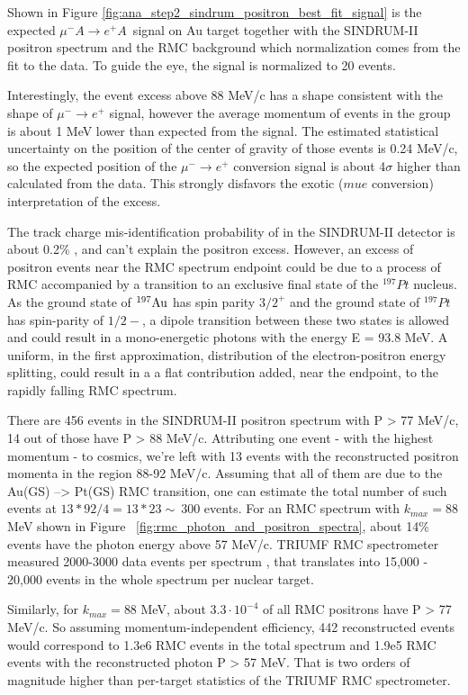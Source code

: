\documentclass[12pt]{article}
\newcommand {\Au}[1]     {\mbox{$\rm ^{#1}Au$}}                 %
\newcommand {\mumepconv} {\mbox{$\mu^- A \rightarrow e^+ A$}}
\begin{document}
Shown in Figure \ref{fig:ana_step2_sindrum_positron_best_fit_signal} is the expected
\mumepconv\ signal on Au target together with the SINDRUM-II positron spectrum and the
RMC background which normalization comes from the fit to the data. To guide the eye,
the signal is normalized to 20 events.

Interestingly, the event excess above 88 MeV/c has a shape consistent with the shape
of $\mu^- \rightarrow e^+$ signal, however the average momentum of events in the group
is about 1 MeV lower than expected from the signal.
The estimated statistical uncertainty on the position of the center of gravity of those
events is 0.24 MeV/c, so the expected position of the $\mu^- \rightarrow e^+$ conversion
signal is about 4$\sigma$ higher than calculated from the data.
This strongly disfavors the exotic ($mu e$ conversion) interpretation of the excess.

The track charge mis-identification probability of in the SINDRUM-II detector
is about 0.2\% \cite{sindrum_ii:Kaulard1998}, and can't explain the positron excess.
%
However, an excess of positron events near the RMC spectrum endpoint could be due
to a process of RMC accompanied by a transition to an exclusive final state
of the $^{197}Pt$ nucleus. As the ground state of \Au{197} has spin parity $3/2^+$
and the ground state of $^{197}Pt$ has spin-parity of $1/2-$, a dipole transition
between these two states is allowed and could result in a mono-energetic photons
with the energy E = 93.8 MeV. A uniform, in the first approximation, distribution
of the electron-positron energy splitting, could result in a a flat contribution 
added, near the endpoint, to the rapidly falling RMC spectrum. 

There are 456 events in the SINDRUM-II positron spectrum with P > 77 MeV/c,
14 out of those have P > 88 MeV/c. Attributing one event - with the highest
momentum - to cosmics, we're left with 13 events with the reconstructed 
positron momenta in the region 88-92 MeV/c. Assuming that all of them are due
to the Au(GS) --> Pt(GS) RMC transition, one can estimate the total number
of such events at $13*92/4 = 13*23 \sim\ 300$ events.
%
For an RMC spectrum with $k_{max}= 88$ MeV shown in Figure ~\ref{fig:rmc_photon_and_positron_spectra}, 
about 14\% events have the photon energy above 57 MeV/c.
TRIUMF RMC spectrometer measured 2000-3000 data events per spectrum \cite{}, that translates
into 15,000 - 20,000 events in the whole spectrum per nuclear target. 

Similarly, for $k_{max}= 88$ MeV, about $3.3\cdot 10^{-4}$ of all RMC positrons have
P > 77 MeV/c. So assuming momentum-independent efficiency, 442 reconstructed events
would correspond to 1.3e6 RMC events in the total spectrum and 1.9e5 RMC events with
the reconstructed photon P > 57 MeV. That is two orders of magnitude higher than
per-target statistics of the TRIUMF RMC spectrometer.
\end{document}
